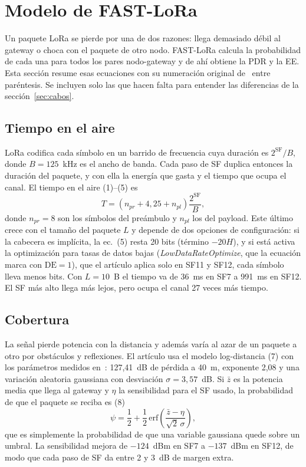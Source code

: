 \documentclass[conference,a4paper]{IEEEtran}
\begin{document}
\section{Modelo de FAST-LoRa}
\label{sec:modelo}

Un paquete LoRa se pierde por una de dos razones: llega demasiado débil al gateway o choca con el paquete de otro nodo. FAST-LoRa calcula la probabilidad de cada una para todos los pares nodo-gateway y de ahí obtiene la PDR y la EE. Esta sección resume esas ecuaciones con su numeración original de~\cite{fastlora} entre paréntesis. Se incluyen solo las que hacen falta para entender las diferencias de la sección~\ref{sec:cabos}.

\subsection{Tiempo en el aire}

LoRa codifica cada símbolo en un barrido de frecuencia cuya duración es $2^{\mathrm{SF}}/B$, donde $B=125$~kHz es el ancho de banda. Cada paso de SF duplica entonces la duración del paquete, y con ella la energía que gasta y el tiempo que ocupa el canal. El tiempo en el aire (1)--(5) es
\begin{equation}
  T=\left(n_{pr}+4{,}25+n_{pl}\right)\frac{2^{\mathrm{SF}}}{B},
  \label{eq:toa}
\end{equation}
donde $n_{pr}=8$ son los símbolos del preámbulo y $n_{pl}$ los del payload. Este último crece con el tamaño del paquete $L$ y depende de dos opciones de configuración: si la cabecera es implícita, la ec.~(5) resta 20 bits (término $-20H$), y si está activa la optimización para tasas de datos bajas (\emph{LowDataRateOptimize}, que la ecuación marca con $\mathrm{DE}=1$), que el artículo aplica solo en SF11 y SF12, cada símbolo lleva menos bits. Con $L=10$~B el tiempo va de 36~ms en SF7 a 991~ms en SF12. El SF más alto llega más lejos, pero ocupa el canal 27 veces más tiempo.

\subsection{Cobertura}

La señal pierde potencia con la distancia y además varía al azar de un paquete a otro por obstáculos y reflexiones. El artículo usa el modelo log-distancia (7) con los parámetros medidos en~\cite{bor}: 127,41~dB de pérdida a 40~m, exponente 2,08 y una variación aleatoria gaussiana con desviación $\sigma=3{,}57$~dB. Si $\bar{z}$ es la potencia media que llega al gateway y $\eta$ la sensibilidad para el SF usado, la probabilidad de que el paquete se reciba es (8)
\begin{equation}
  \psi=\frac12+\frac12\,\mathrm{erf}\!\left(\frac{\bar{z}-\eta}{\sqrt2\,\sigma}\right),
  \label{eq:psi}
\end{equation}
que es simplemente la probabilidad de que una variable gaussiana quede sobre un umbral. La sensibilidad mejora de $-124$~dBm en SF7 a $-137$~dBm en SF12, de modo que cada paso de SF da entre 2 y 3~dB de margen extra.
\end{document}
